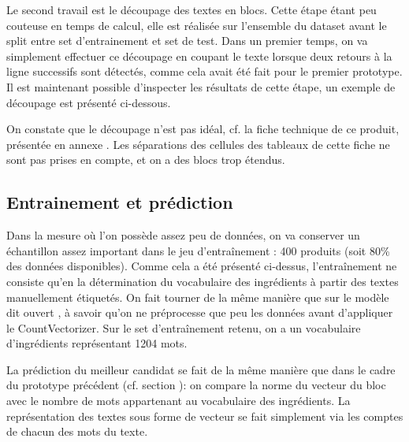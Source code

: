         Le second travail est le découpage des textes en blocs.
        Cette étape étant peu couteuse en temps de calcul, elle est réalisée sur l'ensemble du dataset avant le split entre set d'entrainement et set de test.
        Dans un premier temps, on va simplement effectuer ce découpage en coupant le texte lorsque deux retours à la ligne successifs sont détectés, comme cela avait été fait pour le premier prototype.
        Il est maintenant possible d'inspecter les résultats de cette étape, un exemple de découpage est présenté ci-dessous.

        \begin{multicols}{3}
        \begin{spacing}{1.0}
        \label{blocks_examples}
        {\tiny
        
        }
        \end{spacing}
        \end{multicols}

        On constate que le découpage n'est pas idéal, cf. la fiche technique de ce produit, présentée en annexe .
        Les séparations des cellules des tableaux de cette fiche ne sont pas prises en compte, et on a des blocs trop étendus.

        \subsection{Entrainement et prédiction}

        Dans la mesure où l'on possède assez peu de données, on va conserver un échantillon assez important dans le jeu d'entraînement : 400 produits (soit 80\% des données disponibles).
        Comme cela a été présenté ci-dessus, l'entraînement ne consiste qu'en la détermination du vocabulaire des ingrédients à partir des textes manuellement étiquetés.        
        On fait tourner de la même manière que sur le modèle dit \og ouvert \fg, à savoir qu'on ne préprocesse que peu les données avant d'appliquer le CountVectorizer.
        Sur le set d'entraînement retenu, on a un vocabulaire d'ingrédients représentant 1204 mots.

        La prédiction du meilleur candidat se fait de la même manière que dans le cadre du prototype précédent (cf. section ): on compare la norme du vecteur du bloc avec le nombre de mots appartenant au vocabulaire des ingrédients.
        La représentation des textes sous forme de vecteur se fait simplement via les comptes de chacun des mots du texte.

